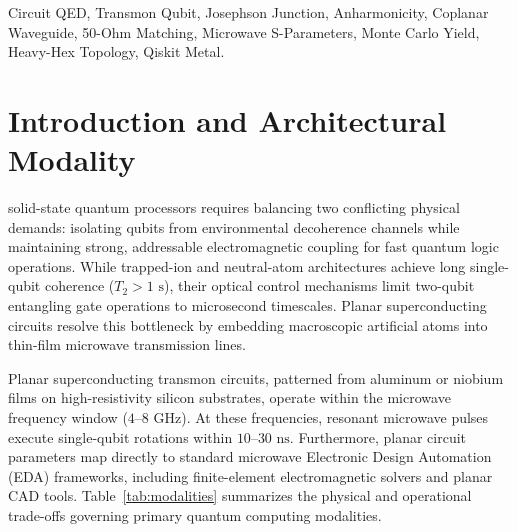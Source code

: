 \documentclass[10pt,journal,compsoc]{IEEEtran}
\begin{document}
\begin{IEEEkeywords}
Circuit QED, Transmon Qubit, Josephson Junction, Anharmonicity, Coplanar Waveguide, 50-Ohm Matching, Microwave S-Parameters, Monte Carlo Yield, Heavy-Hex Topology, Qiskit Metal.
\end{IEEEkeywords}

\section{Introduction and Architectural Modality}

 solid-state quantum processors requires balancing two conflicting physical demands: isolating qubits from environmental decoherence channels while maintaining strong, addressable electromagnetic coupling for fast quantum logic operations. While trapped-ion and neutral-atom architectures achieve long single-qubit coherence ($T_2 > 1\text{ s}$), their optical control mechanisms limit two-qubit entangling gate operations to microsecond timescales. Planar superconducting circuits resolve this bottleneck by embedding macroscopic artificial atoms into thin-film microwave transmission lines.

Planar superconducting transmon circuits, patterned from aluminum or niobium films on high-resistivity silicon substrates, operate within the microwave frequency window ($4\text{--}8\text{ GHz}$). At these frequencies, resonant microwave pulses execute single-qubit rotations within $10\text{--}30\text{ ns}$. Furthermore, planar circuit parameters map directly to standard microwave Electronic Design Automation (EDA) frameworks, including finite-element electromagnetic solvers and planar CAD tools. Table~\ref{tab:modalities} summarizes the physical and operational trade-offs governing primary quantum computing modalities.
\end{document}
